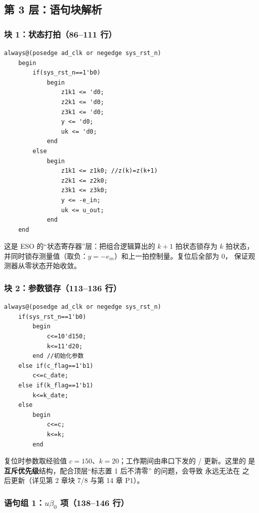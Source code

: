 \subsection{第 3 层：语句块解析}

\subsubsection{块 1：状态打拍（86--111 行）}

\begin{lstlisting}[style=vsnip]
always@(posedge ad_clk or negedge sys_rst_n)
    begin
        if(sys_rst_n==1'b0)
            begin
                z1k1 <= 'd0;
                z2k1 <= 'd0;
                z3k1 <= 'd0;
                y <= 'd0;
                uk <= 'd0;
            end
        else
            begin
                z1k1 <= z1k0; //z(k)=z(k+1)
                z2k1 <= z2k0;
                z3k1 <= z3k0;
                y <= -e_in;
                uk <= u_out;
            end
    end
\end{lstlisting}

这是 ESO 的“状态寄存器”层：把组合逻辑算出的 $k+1$ 拍状态锁存为 $k$ 拍状态，
并同时锁存测量值（取负：$y=-e_{in}$）和上一拍控制量。复位后全部为 0，
保证观测器从零状态开始收敛。

\subsubsection{块 2：参数锁存（113--136 行）}

\begin{lstlisting}[style=vsnip]
always@(posedge ad_clk or negedge sys_rst_n)
    if(sys_rst_n==1'b0)
        begin
            c<=10'd150;
            k<=11'd20;
        end //初始化参数
    else if(c_flag==1'b1)
        c<=c_date;
    else if(k_flag==1'b1)
        k<=k_date;
    else
        begin
            c<=c;
            k<=k;
        end
\end{lstlisting}

复位时参数取经验值 $c=150$、$k=20$；工作期间由串口下发的 /
更新。这里的  是\textbf{互斥优先级}结构，配合顶层“标志置 1 后不清零”
的问题，会导致  永远无法在  之后更新（详见第 2 章块 7/8 与第 14 章 P1）。

\subsubsection{语句组 1：$u\beta_0$ 项（138--146 行）}

